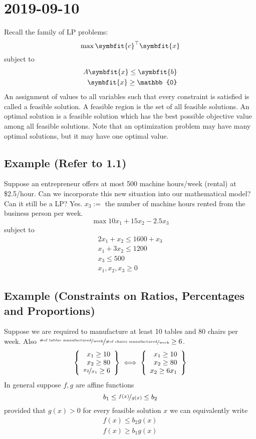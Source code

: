 \section{2019-09-10}
Recall the family of LP problems:
\[\max \symbfit{c}^\top \symbfit{x}\]
subject to
\begin{align*}
    A\symbfit{x}\le \symbfit{b}\\
    \symbfit{x}\ge \mathbb{0}
\end{align*}
An assignment of values to all variables such that every
constraint is satisfied is called a feasible solution.
A feasible region is the set of all feasible solutions.
An optimal solution is a feasible solution which has the best
possible objective value among all feasible solutions.
Note that an optimization problem may have many optimal
solutions, but it may have one optimal value.
\subsection{Example (Refer to 1.1)}
Suppose an entrepreneur offers at most 500 machine hours/week
(rental) at \$2.5/hour. Can we incorporate this new situation
into our mathematical model? Can it still be a LP? Yes.
$x_3:=$ the number of machine hours rented from the business
person per week.
\[\max 10x_1+15x_2-2.5x_3\]
subject to
\begin{align*}
    2x_1+x_2\le 1600+x_3\\
    x_1+3x_2\le 1200\\
    x_3\le 500\\
    x_1,x_2,x_3\ge 0
\end{align*}

\subsection{Example (Constraints on Ratios, Percentages and Proportions)}
Suppose we are required to manufacture at least 10 tables and
80 chairs per week. Also 
$\nicefrac{\nicefrac{\text{\#of tables manufactured}}{\text{week}}}
{\nicefrac{\text{\#of chairs manufactured}}{\text{week}}}
\ge 6$.
\[
   \left\{\begin{array}{r}
        x_1\ge 10\\
        x_2\ge 80\\
        \nicefrac{x_2}{x_1}\ge 6
    \end{array}\right\}
    \iff
    \left\{\begin{array}{r}
        x_1\ge 10\\
        x_2\ge 80\\
        x_2\ge 6x_1
    \end{array}\right\}
\]
In general suppose $f,g$ are affine functions
\[
    b_1\le \nicefrac{f(x)}{g(x)}\le b_2
\]
provided that $g(x)>0$ for every feasible solution $x$ we
can equivalently write
\begin{align*}
    f(x)\le b_2 g(x)\\
    f(x)\ge b_1 g(x)
\end{align*}

